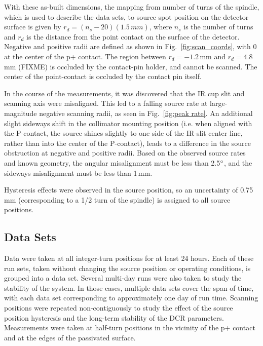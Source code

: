 With these as-built dimensions, the mapping from number of turns of the spindle, which is used to describe the data sets, to source spot position on the detector surface is given by $r_d = (n_s-20)(1.5\,mm)$, where $n_s$ is the number of turns and $r_d$ is the distance from the point contact on the surface of the detector. Negative and positive radii are defined as shown in Fig.~\ref{fig:scan_coords}, with 0 at the center of the p+ contact. The region between $r_d = -1.2$\,mm and  $r_d = 4.8$\,mm (FIXME) is occluded by the contact-pin holder, and cannot be scanned. The center of the point-contact is occluded by the contact pin itself. 

In the course of the measurements, it was discovered that the IR cup slit and scanning axis were misaligned. This led to a falling source rate at large-magnitude negative scanning radii, as seen in Fig.~\ref{fig:peak rate}. An additional slight sideways shift in the collimator mounting position (i.e. when aligned with the P-contact, the source shines slightly to one side of the IR-slit center line, rather than into the center of the P-contact), leads to a difference in the source obstruction at negative and positive radii. Based on the observed source rates and known geometry, the angular misalignment must be less than 2.5$\degree$, and the sideways misalignment must be less than 1\,mm. 

Hysteresis effects were observed in the source position, so an uncertainty of 0.75\,mm (corresponding to a 1/2 turn of the spindle) is assigned to all source positions. 

\subsection{Data Sets}
Data were taken at all integer-turn positions for at least 24 hours. Each of these run sets, taken without changing the source position or operating conditions, is grouped into a data set. Several multi-day runs were also taken to study the stability of the system. In those cases, multiple data sets cover the span of time, with each data set corresponding to approximately one day of run time. Scanning positions were repeated non-contiguously to study the effect of the source position hysteresis and the long-term stability of the DCR parameters. Measurements were taken at half-turn positions in the vicinity of the p+ contact and at the edges of the passivated surface.  

%

